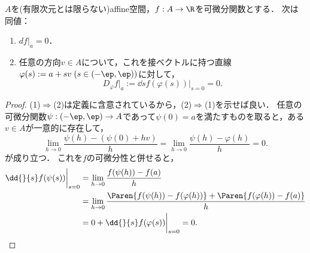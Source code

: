 \documentclass[uplatex,dvipdfmx]{jsarticle}
\begin{document}
\begin{exercise}[affine空間上で微分が消えることの特徴付け]
    $A$を(有限次元とは限らない)affine空間，$f:A\to\R$を可微分関数とする．
    次は同値：
    \begin{enumerate}
        \item $df|_a=0$．
        \item 任意の方向$v\in A$について，これを接ベクトルに持つ直線$\varphi(s):=a+sv\;(s\in(-\ep,\ep))$に対して，
        \[D_\varphi f|_a:=\dd{}{s}f(\varphi(s))\biggr|_{s=0}=0.\]
    \end{enumerate}
\end{exercise}
\begin{proof}
    (1)$\Rightarrow$(2)は定義に含意されているから，(2)$\Rightarrow$(1)を示せば良い．
    任意の可微分関数$\psi:(-\ep,\ep)\to A$であって$\psi(0)=a$を満たすものを取ると，ある$v\in A$が一意的に存在して，
    \[\lim_{h\to0}\frac{\psi(h)-(\psi(0)+hv)}{h}=\lim_{h\to0}\frac{\psi(h)-\varphi(h)}{h}=0.\]
    が成り立つ．
    これを$f$の可微分性と併せると，
    \begin{align*}
        \dd{}{s}f(\psi(s))\biggr|_{s=0}&=\lim_{h\to0}\frac{f(\psi(h))-f(a)}{h}\\
        &=\lim_{h\to0}\frac{\Paren{f(\psi(h))-f(\varphi(h))}+\Paren{f(\varphi(h))-f(a)}}{h}\\
        &=0+\dd{}{s}f(\varphi(s))\biggr|_{s=0}=0.
    \end{align*}
\end{proof}
\end{document}
